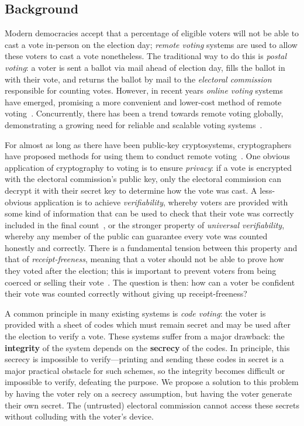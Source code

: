 \documentclass[12pt,a4paper]{article}
\theoremstyle{definition}
\begin{document}
\subsection{Background}
Modern democracies accept that a percentage of eligible voters will not be able to cast a vote in-person on the election day; \textit{remote voting} systems are used to allow these voters to cast a vote nonetheless. The traditional way to do this is \textit{postal voting}: a voter is sent a ballot via mail ahead of election day, fills the ballot in with their vote, and returns the ballot by mail to the \textit{electoral commission} responsible for counting votes. However, in recent years \textit{online voting} systems have emerged, promising a more convenient and lower-cost method of remote voting~\cite{nswivote,scytlsvote}. Concurrently, there has been a trend towards remote voting globally, demonstrating a growing need for reliable and scalable voting systems~\cite{VEC_PostalVoting_Position,rallings2010,gjosteen2011norwegian}.

For almost as long as there have been public-key cryptosystems, cryptographers have proposed methods for using them to conduct remote voting~\cite{cohen1985robust}. One obvious application of cryptography to voting is to ensure \textit{privacy}: if a vote is encrypted with the electoral commission's public key, only the electoral commission can decrypt it with their secret key to determine how the vote was cast. A less-obvious application is to achieve \textit{verifiability}, whereby voters are provided with some kind of information that can be used to check that their vote was correctly included in the final count~\cite{benaloh1987verifiable}, or the stronger property of \textit{universal verifiability}, whereby any member of the public can guarantee every vote was counted honestly and correctly. There is a fundamental tension between this property and that of \textit{receipt-freeness}, meaning that a voter should not be able to prove how they voted after the election; this is important to prevent voters from being coerced or selling their vote~\cite{benaloh1994receipt}. The question is then: how can a voter be confident their vote was counted correctly without giving up receipt-freeness?

A common principle in many existing systems is \textit{code voting}: the voter is provided with a sheet of codes which must remain secret and may be used after the election to verify a vote. These systems suffer from a major drawback: the \textbf{integrity} of the system depends on the \textbf{secrecy} of the codes. In principle, this secrecy is impossible to verify---printing and sending these codes in secret is a major practical obstacle for such schemes, so the integrity becomes difficult or impossible to verify, defeating the purpose. We propose a solution to this problem by having the voter rely on a secrecy assumption, but having the voter generate their own secret. The (untrusted) electoral commission cannot access these secrets without colluding with the voter's device.
\end{document}
